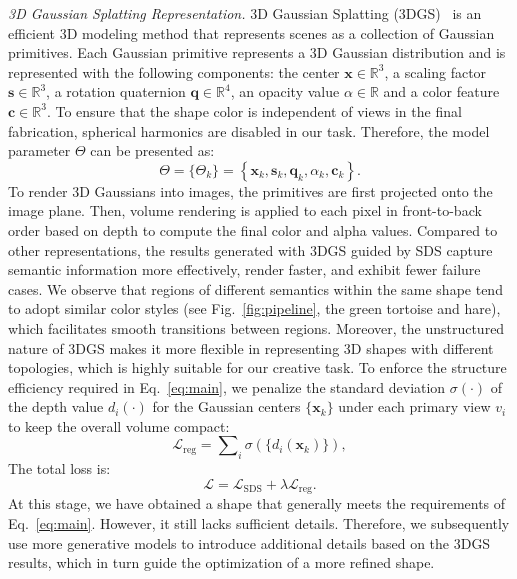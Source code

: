 \textit{3D Gaussian Splatting Representation. }
3D Gaussian Splatting (3DGS)~\cite{3DGauss, tang2023dreamgaussian} is an efficient 3D modeling method that represents scenes as a collection of Gaussian primitives. Each Gaussian primitive represents a 3D Gaussian distribution and is represented with the following components: the center $\mathbf{x}\in\mathbb{R}^{3}$, a scaling factor $\mathbf{s} \in \mathbb{R}^{3}$, a rotation quaternion $\mathbf{q} \in \mathbb{R}^{4}$, an opacity value $\alpha \in \mathbb{R}$ and a color feature $\mathbf{c} \in \mathbb{R}^{3}$. To ensure that the shape color is independent of views in the final fabrication, spherical harmonics are disabled in our task. Therefore, the model parameter $\Theta$ can be presented as: 
\begin{equation}
    \Theta=\{\Theta_{k}\}=\left\{\mathbf{x}_{k}, \mathbf{s}_{k}, \mathbf{q}_{k}, \alpha_{k}, \mathbf{c}_{k}\right\}.
\end{equation}
To render 3D Gaussians into images, the primitives are first projected onto the image plane. Then, volume rendering is applied to each pixel in front-to-back order based on depth to compute the final color and alpha values.
Compared to other representations, the results generated with 3DGS guided by SDS capture semantic information more effectively, render faster, and exhibit fewer failure cases. We observe that regions of different semantics within the same shape tend to adopt similar color styles (see Fig.~\ref{fig:pipeline}, the green tortoise and hare), which facilitates smooth transitions between regions. 
Moreover, the unstructured nature of 3DGS makes it more flexible in representing 3D shapes with different topologies, which is highly suitable for our creative task.
To enforce the structure efficiency required in Eq.~\eqref{eq:main}, we penalize the standard deviation $\sigma(\cdot)$ of the depth value $d_i(\cdot)$ for the Gaussian centers $\{\mathbf{x}_k\}$ under each primary view $v_i$ to keep the overall volume compact:
\begin{equation}
\mathcal{L}_{\mathrm{reg}}=\sum\nolimits_i \sigma(\{d_i\left(\mathbf{x}_k\right)\}),
\end{equation}
The total loss is:
\begin{equation}
\mathcal{L}=\mathcal{L}_{\mathrm{SDS}}+\lambda\mathcal{L}_{\mathrm{reg}}.
\end{equation}
At this stage, we have obtained a shape that generally meets the requirements of Eq.~\eqref{eq:main}. However, it still lacks sufficient details. Therefore, we subsequently use more generative models to introduce additional details based on the 3DGS results, which in turn guide the optimization of a more refined shape.



